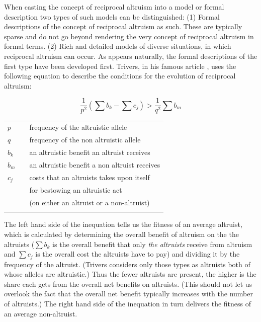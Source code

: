 When casting the concept of reciprocal altruism into a model or formal
description two types of such models can be distinguished: (1) Formal
descriptions of the concept of reciprocal altruism as such. These are
typically sparse and do not go beyond rendering the very concept of reciprocal
altruism in formal terms. (2) Rich and detailed models of diverse situations,
in which reciprocal altruism can occur.
As appears naturally, the formal descriptions of the first type have been
developed first. Trivers, in his famous article \cite[]{trivers:1971}, uses
the following equation to describe the conditions for the evolution of
reciprocal altruism:

\begin{equation}
\label{triversEquation}
\frac{1}{p^2}(\sum{} b_k - \sum{} c_j) > \frac{1}{q^2} \sum{} b_m
\end{equation}
\begin{tabular}{lll}
  $p$      & & frequency of the altruistic allele \\
  $q$      & & frequency of the non altruistic allele \\
  $b_k$    & & an altruistic benefit an altruist receives \\
  $b_m$    & & an altruistic benefit a non altruist receives \\
  $c_j$    & & costs that an altruists takes upon itself \\
           & & for bestowing an altruistic act \\
           & & (on either an altruist or a non-altruist) \\
           & & \\
\end{tabular} \cite[p.\ 37]{trivers:1971}

The left hand side of the inequation tells us the fitness of an average
altruist, which is calculated by determining the overall benefit of altruism
on the the altruists ($\sum{} b_k$ is the overall benefit that only {\em the
  altruists} receive from altruism and $\sum{} c_j$ is the overall cost the
altruists have to pay) and dividing it by the frequency of the altruist.
(Trivers considers only those types as altruists both of whose alleles are
altruistic.) Thus the fewer altruists are present, the higher is the share
each gets from the overall net benefits on altruists. (This should not let us
overlook the fact that the overall net benefit typically increases with the
number of altruists.) The right hand side of the inequation in turn delivers
the fitness of an average non-altruist.

